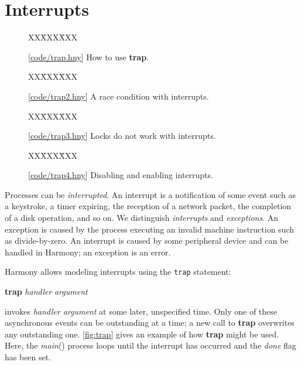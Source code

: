 \documentclass{report}
\newcommand{\harmonysource}[1]{
\begin{tabbing}
XX\=XXX\=XXX\kill
    
\end{tabbing}
}
\newcommand{\harmonylink}[1]{%
[\href{https://www.cs.cornell.edu/home/rvr/harmony/#1}{\underline{#1}}]%
}
\newenvironment{code}{
\tcolorbox
}{
\endtcolorbox
}
\begin{document}
\chapter{Interrupts}
\label{ch:interrupts}

\begin{figure}
\begin{code}
\harmonysource{trap}
\end{code}
\caption{\harmonylink{code/trap.hny} How to use \textbf{trap}.}
\label{fig:trap}
\end{figure}

\begin{figure}
\begin{code}
\harmonysource{trap2}
\end{code}
\caption{\harmonylink{code/trap2.hny} A race condition with interrupts.}
\label{fig:trap2}
\end{figure}

\begin{figure}
\begin{code}
\harmonysource{trap3}
\end{code}
\caption{\harmonylink{code/trap3.hny} Locks do not work with interrupts.}
\label{fig:trap3}
\end{figure}

\begin{figure}
\begin{code}
\harmonysource{trap4}
\end{code}
\caption{\harmonylink{code/trap4.hny} Disabling and enabling interrupts.}
\label{fig:trap4}
\end{figure}

Processes can be \emph{interrupted}.  An interrupt is a notification of some event
such as a keystroke, a timer expiring, the reception of a network packet, the completion
of a disk operation, and so on.  We distinguish \emph{interrupts} and \emph{exceptions}.
An exception is caused by the process executing an invalid machine instruction such as
divide-by-zero.  An interrupt is caused by some peripheral device and can be handled in
Harmony; an exception is an error.

Harmony allows modeling interrupts using the \texttt{trap} statement:
\begin{code}
\textbf{trap} \textit{handler} \textit{argument}
\end{code}
invokes \textit{handler argument} at some later, unspecified time.
Only one of these asynchronous events can be outstanding at a time; a new call to
\textbf{trap} overwrites any outstanding one.
\autoref{fig:trap} gives an example of how \textbf{trap} might be used.
Here, the \textit{main}() process loops until the interrupt has occurred and
the \textit{done} flag has been set.
\end{document}
